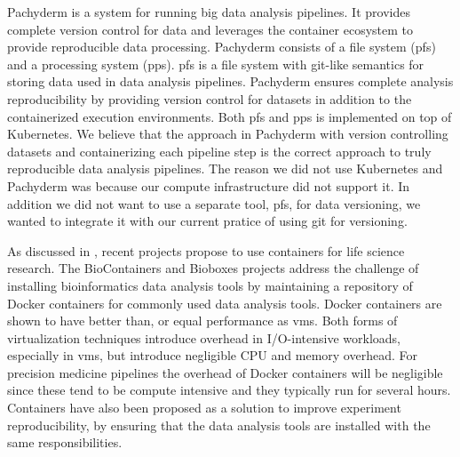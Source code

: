 Pachyderm is a system for running  big data analysis pipelines. It provides
complete version control for data and leverages the container ecosystem to
provide reproducible data processing.\cite{pachyderm} Pachyderm
consists of a file system (\gls{pfs}) and a processing system (\gls{pps}).
\gls{pfs} is a file system with git-like semantics for storing data used
in data analysis pipelines. Pachyderm ensures complete analysis reproducibility
by providing version control for datasets in addition to the containerized
execution environments. Both \gls{pfs} and \gls{pps} is implemented on top
of Kubernetes.\cite{kubernetes} We believe that the approach in
Pachyderm with version controlling datasets and containerizing each pipeline
step is the correct approach to truly reproducible data analysis pipelines. 
The reason we did not use Kubernetes and Pachyderm was because our compute
infrastructure did not support it. In addition we did not want to use a separate
tool, \gls{pfs}, for data versioning, we wanted to integrate it with our current
pratice of using git for versioning. 

As discussed in \cite{NIK}, recent projects propose to use containers for life
science research. The BioContainers and Bioboxes\cite{belmann2015bioboxes}
projects address the challenge of installing bioinformatics data analysis tools
by maintaining a repository of Docker containers for commonly used data analysis
tools. Docker containers are shown to have better than, or equal performance as
\glspl{vm}.\cite{di2015impact} Both forms of virtualization techniques introduce
overhead in I/O-intensive workloads, especially in \glspl{vm}, but introduce
negligible CPU and memory overhead. For precision medicine pipelines the
overhead of Docker containers will be negligible since these tend to be compute
intensive and they typically run for several hours.\cite{di2015impact} 
Containers have also been proposed as a solution to improve experiment
reproducibility, by ensuring that the data analysis tools are installed with the
same responsibilities.\cite{boettiger2015introduction} 


